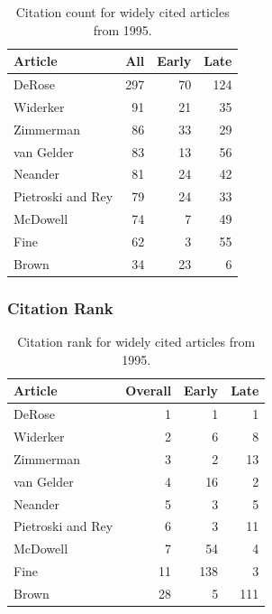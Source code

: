 \documentclass[
  10pt,
  letterpaper,
  DIV=11,
  numbers=noendperiod,
  twoside]{scrartcl}
\begin{document}
\begin{longtable}[]{@{}lrrr@{}}

\caption{\label{tbl-citation-count-1995}Citation count for widely cited
articles from 1995.}

\tabularnewline

\toprule\noalign{}
Article & All & Early & Late \\
\midrule\noalign{}
\endhead
\bottomrule\noalign{}
\endlastfoot
DeRose & 297 & 70 & 124 \\
Widerker & 91 & 21 & 35 \\
Zimmerman & 86 & 33 & 29 \\
van Gelder & 83 & 13 & 56 \\
Neander & 81 & 24 & 42 \\
Pietroski and Rey & 79 & 24 & 33 \\
McDowell & 74 & 7 & 49 \\
Fine & 62 & 3 & 55 \\
Brown & 34 & 23 & 6 \\

\end{longtable}

\subsubsection*{Citation Rank}\label{sec-rank-1995}

\begin{longtable}[]{@{}lrrr@{}}

\caption{\label{tbl-citation-rank-1995}Citation rank for widely cited
articles from 1995.}

\tabularnewline

\toprule\noalign{}
Article & Overall & Early & Late \\
\midrule\noalign{}
\endhead
\bottomrule\noalign{}
\endlastfoot
DeRose & 1 & 1 & 1 \\
Widerker & 2 & 6 & 8 \\
Zimmerman & 3 & 2 & 13 \\
van Gelder & 4 & 16 & 2 \\
Neander & 5 & 3 & 5 \\
Pietroski and Rey & 6 & 3 & 11 \\
McDowell & 7 & 54 & 4 \\
Fine & 11 & 138 & 3 \\
Brown & 28 & 5 & 111 \\

\end{longtable}
\end{document}
